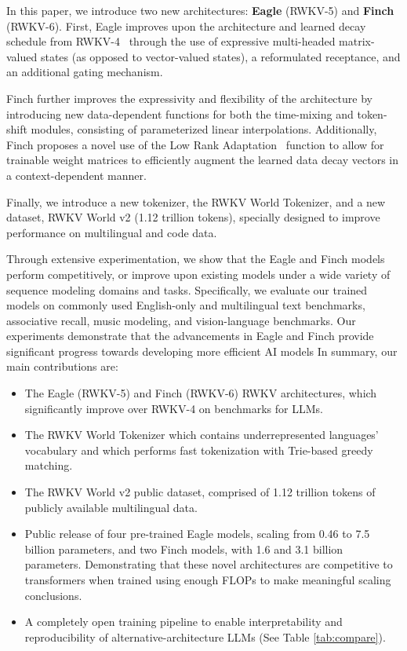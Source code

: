 In this paper, we introduce two new architectures: \textbf{Eagle} (RWKV-5) and \textbf{Finch} (RWKV-6). First, Eagle improves upon the architecture and learned decay schedule from RWKV-4~\citep{peng2023rwkv} through the use of expressive multi-headed matrix-valued states (as opposed to vector-valued states), a reformulated receptance, and an additional gating mechanism. 

Finch further improves the expressivity and flexibility of the architecture by introducing new data-dependent functions for both the time-mixing and token-shift modules, consisting of parameterized linear interpolations. Additionally, Finch proposes a novel use of the Low Rank Adaptation~\citep{hu2022lora} function to allow for trainable weight matrices to efficiently augment the learned data decay vectors in a context-dependent manner.

Finally, we introduce a new tokenizer, the RWKV World Tokenizer, and a new dataset, RWKV World v2 (1.12 trillion tokens), specially designed to improve performance on multilingual and code data.

Through extensive experimentation, we show that the Eagle and Finch models perform competitively, or improve upon existing models under a wide variety of sequence modeling domains and tasks. Specifically, we evaluate our trained models on commonly used English-only and multilingual text benchmarks, associative recall, music modeling, and vision-language benchmarks. Our experiments demonstrate that the advancements in Eagle and Finch provide significant progress towards developing more efficient AI models In summary, our main contributions are:

\begin{itemize}
    \item The Eagle (RWKV-5) and Finch (RWKV-6) RWKV architectures, which significantly improve over RWKV-4 on benchmarks for LLMs.
    \item The RWKV World Tokenizer which contains underrepresented languages' vocabulary and which performs fast tokenization with Trie-based greedy matching.

    \item The RWKV World v2 public dataset, comprised of 1.12 trillion tokens of publicly available multilingual data.
    \item Public release of four pre-trained Eagle models, scaling from 0.46 to 7.5 billion parameters, and two Finch models, with 1.6 and 3.1 billion parameters. Demonstrating that these novel architectures are competitive to transformers when trained using enough FLOPs to make meaningful scaling conclusions.
    \item A completely open training pipeline to enable interpretability and reproducibility of alternative-architecture LLMs (See Table \ref{tab:compare}).

\end{itemize}

